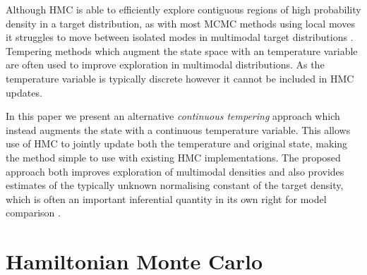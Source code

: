 
Although \ac{HMC} is able to efficiently explore contiguous regions of high probability density in a target distribution, as with most \ac{MCMC} methods using local moves it struggles to move between isolated modes in multimodal target distributions \citep{neal2011mcmc}. Tempering methods \citep{swendsen1986replica,geyer1991markov,marinari1992simulated} which augment the state space with an temperature variable are often used to improve exploration in multimodal distributions. As the temperature variable is typically discrete however it cannot be included in \ac{HMC} updates.

In this paper we present an alternative \emph{continuous tempering} approach which instead augments the state with a continuous temperature variable. This allows use of \ac{HMC} to jointly update both the temperature and original state, making the method simple to use with existing \ac{HMC} implementations. The proposed approach both improves exploration of multimodal densities and also provides estimates of the typically unknown normalising constant of the target density, which is often an important inferential quantity in its own right for model comparison \citep{gelman1998simulating}.

\section{Hamiltonian Monte Carlo}

